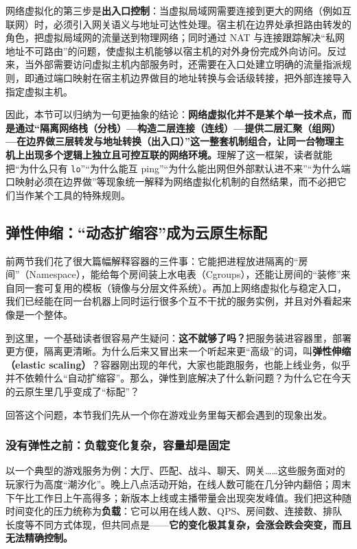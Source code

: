 网络虚拟化的第三步是\textbf{出入口控制}：当虚拟局域网需要连接到更大的网络（例如互联网）时，必须引入网关语义与地址可达性处理。宿主机在边界处承担路由转发的角色，把虚拟局域网的流量送到物理网络；同时通过 NAT 与连接跟踪解决“私网地址不可路由”的问题，使虚拟主机能够以宿主机的对外身份完成外向访问。反过来，当外部需要访问虚拟主机内部服务时，还需要在入口处建立明确的流量指派规则，即通过端口映射在宿主机边界做目的地址转换与会话级转接，把外部连接导入指定虚拟主机。

因此，本节可以归纳为一句更抽象的结论：\textbf{网络虚拟化并不是某个单一技术点，而是通过“隔离网络栈（分栈）—构造二层连接（连线）—提供二层汇聚（组网）—在边界做三层转发与地址转换（出入口）”这一整套机制组合，让同一台物理主机上出现多个逻辑上独立且可控互联的网络环境。}理解了这一框架，读者就能把“为什么只有 \texttt{lo}”“为什么能互 ping”“为什么能出网但外部默认进不来”“为什么端口映射必须在边界做”等现象统一解释为网络虚拟化机制的自然结果，而不必把它们当作某个工具的特殊规则。





\subsection{弹性伸缩：“动态扩缩容”成为云原生标配}

前两节我们花了很大篇幅解释容器的三件事：它能把进程放进隔离的“房间”（Namespace），能给每个房间装上水电表（Cgroups），还能让房间的“装修”来自同一套可复用的模板（镜像与分层文件系统）。再加上网络虚拟化与稳定入口，我们已经能在同一台机器上同时运行很多个互不干扰的服务实例，并且对外看起来像是一个整体。

到这里，一个基础读者很容易产生疑问：\textbf{这不就够了吗？}把服务装进容器里，部署更方便，隔离更清晰。为什么后来又冒出来一个听起来更“高级”的词，叫\textbf{弹性伸缩（elastic scaling）}？容器刚出现的年代，大家也能跑服务，也能上线业务，似乎并不依赖什么“自动扩缩容”。那么，弹性到底解决了什么新问题？为什么它在今天的云原生里几乎变成了“标配”？

回答这个问题，本节我们先从一个你在游戏业务里每天都会遇到的现象出发。

\subsubsection{没有弹性之前：负载变化复杂，容量却是固定}

以一个典型的游戏服务为例：大厅、匹配、战斗、聊天、网关……这些服务面对的玩家行为高度“潮汐化”。晚上八点活动开始，在线人数可能在几分钟内翻倍；周末下午比工作日上午高得多；新版本上线或主播带量会出现突发峰值。我们把这种随时间变化的压力统称为\textbf{负载}：它可以用在线人数、QPS、房间数、连接数、排队长度等不同方式体现，但共同点是——\textbf{它的变化极其复杂，会涨会跌会突变，而且无法精确控制。}

